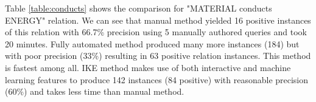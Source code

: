 \documentclass[11pt,letterpaper]{article}
\begin{document}
\begin{table}[tbh]
\centering
\boldmath
{}
\caption{Relation (``MATERIAL'' conducts ``ENERGY''): Comparison of three types of extraction methods.} \label{table:conducts}
\end{table}

\begin{table}[tbh]
\centering
\boldmath
{}
\caption{Relation (``ORGANISM'' has ``BODYPART''): Comparison of three types of extraction methods.} \label{table:body-parts}
\end{table}

Table \ref{table:conducts} shows the comparison for "MATERIAL conducts ENERGY" relation.
We can see that manual method yielded 16 positive instances of this relation with 66.7\% precision using 5 manually authored queries and took 20 minutes. Fully automated method produced many more instances (184) but with poor precision (33\%) resulting in 63 positive relation instances. This method is fastest among all. IKE method makes use of both interactive and machine learning features to produce 142 instances (84 positive) with reasonable precision (60\%) and takes less time than manual method. 
\end{document}
